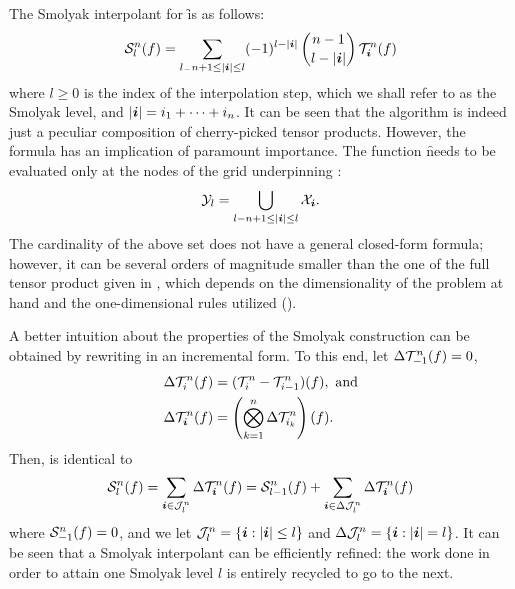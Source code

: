 The Smolyak interpolant for \f is as follows:
\[
  \mathcal{S}^{n}_{l}(f) = \sum_{{l_{-}} n + 1 \leq |\boldsymbol{i}| \leq l} (-1)^{l - |\boldsymbol{i}|} \, {n - 1 \choose l - |\boldsymbol{i}|} \, \mathcal{T}^{n}_{\boldsymbol{i}}(f)
\]
where $l \geq 0$ is the index of the interpolation step, which we shall refer to
as the Smolyak level, and $|\boldsymbol{i}| = i_1 + \dots + i_n$. It can be seen that the
algorithm is indeed just a peculiar composition of cherry-picked tensor
products. However, the formula has an implication of paramount importance. The
function \f needs to be evaluated only at the nodes of the grid underpinning
:
\[
  \mathcal{Y}_l = \bigcup_{l - n + 1 \leq |\boldsymbol{i}| \leq l} \mathcal{X}_{\boldsymbol{i}}.
\]
The cardinality of the above set does not have a general closed-form formula;
however, it can be several orders of magnitude smaller than the one of the full
tensor product given in , which depends on the
dimensionality of the problem at hand and the one-dimensional rules utilized
().

A better intuition about the properties of the Smolyak construction can be
obtained by rewriting  in an incremental form. To this
end, let $\Delta\mathcal{T}^{n}_{-1}(f) = 0$,
\begin{align*}
  & \Delta\mathcal{T}^{n}_{i}(f) = (\mathcal{T}^{n}_{i} - \mathcal{T}^{n}_{i - 1})(f), \text{ and} \\
  & \Delta\mathcal{T}^{n}_{\boldsymbol{i}}(f) = \left( \bigotimes_{k = 1}^n \Delta\mathcal{T}^{n}_{i_k} \right)(f).
\end{align*}
Then,  is identical to
\[
  \mathcal{S}^{n}_{l}(f)
  = \sum_{\boldsymbol{i} \in \mathcal{J}^{n}_{l}} \Delta\mathcal{T}^{n}_{\boldsymbol{i}}(f)
  = \mathcal{S}^{n}_{l - 1}(f) + \sum_{\boldsymbol{i} \in \Delta\mathcal{J}^{n}_{l}} \Delta\mathcal{T}^{n}_{\boldsymbol{i}}(f)
\]
where $\mathcal{S}^{n}_{-1}(f) = 0$, and we let $\mathcal{J}^{n}_{l} = \{ \boldsymbol{i}: |\boldsymbol{i}|
\leq l \}$ and $\Delta\mathcal{J}^{n}_{l} = \{ \boldsymbol{i}: |\boldsymbol{i}| = l \}$. It can be seen
that a Smolyak interpolant can be efficiently refined: the work done in order to
attain one Smolyak level $l$ is entirely recycled to go to the next.

